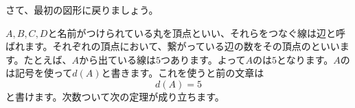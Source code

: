 \documentclass{ltjsarticle}
\begin{document}
さて、最初の図形に戻りましょう。

\begin{center}
\end{center}

$A,B,C,D$と名前がつけられている丸を頂点といい、それらをつなぐ線は辺と呼ばれます。それぞれの頂点において、繋がっている辺の数をその頂点のといいます。たとえば、$A$から出ている線は$5$つあります。よって$A$のは$5$となります。$A$のは記号を使って$d(A)$と書きます。これを使うと前の文章は
\begin{equation}
d(A) = 5
\end{equation}
と書けます。次数ついて次の定理が成り立ちます。
\end{document}
